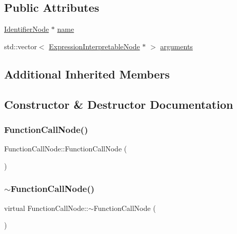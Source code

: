 \subsection*{Public Attributes}
\begin{DoxyCompactItemize}
\item 
\hyperlink{classIdentifierNode}{Identifier\+Node} $\ast$ \hyperlink{classFunctionCallNode_a03ebfc10277d6c6a7698b5eb0c02ac73}{name}
\item 
std\+::vector$<$ \hyperlink{classExpressionInterpretableNode}{Expression\+Interpretable\+Node} $\ast$ $>$ \hyperlink{classFunctionCallNode_a087579d1f0ece94640b4821830f72b55}{arguments}
\end{DoxyCompactItemize}
\subsection*{Additional Inherited Members}


\subsection{Constructor \& Destructor Documentation}
\mbox{\label{classFunctionCallNode_af4c639d83ec4fc10ee4648277cedc134}} 
\subsubsection{\texorpdfstring{Function\+Call\+Node()}{FunctionCallNode()}}
{\footnotesize\ttfamily Function\+Call\+Node\+::\+Function\+Call\+Node (\begin{DoxyParamCaption}{ }\end{DoxyParamCaption})}

\mbox{\label{classFunctionCallNode_a781834ac40eada17d2f9dc53a8bd26e5}} 
\subsubsection{\texorpdfstring{$\sim$\+Function\+Call\+Node()}{~FunctionCallNode()}}
{\footnotesize\ttfamily virtual Function\+Call\+Node\+::$\sim$\+Function\+Call\+Node (\begin{DoxyParamCaption}{ }\end{DoxyParamCaption})\hspace{0.3cm}{\ttfamily [virtual]}}



